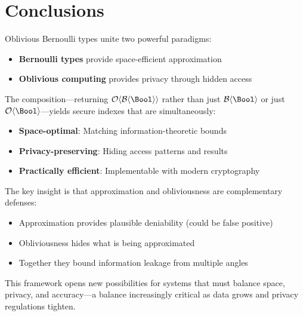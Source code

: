\documentclass[11pt,final,hidelinks]{article}
\newcommand{\BernBool}{\mathcal{B}\langle \Bool \rangle}
\begin{document}
\section{Conclusions}

Oblivious Bernoulli types unite two powerful paradigms:
\begin{itemize}
    \item \textbf{Bernoulli types} provide space-efficient approximation
    \item \textbf{Oblivious computing} provides privacy through hidden access
\end{itemize}

The composition—returning $\Obv{\BernBool}$ rather than just $\BernBool$ or just $\Obv{\Bool}$—yields secure indexes that are simultaneously:
\begin{itemize}
    \item \textbf{Space-optimal}: Matching information-theoretic bounds
    \item \textbf{Privacy-preserving}: Hiding access patterns and results
    \item \textbf{Practically efficient}: Implementable with modern cryptography
\end{itemize}

The key insight is that approximation and obliviousness are complementary defenses:
\begin{itemize}
    \item Approximation provides plausible deniability (could be false positive)
    \item Obliviousness hides what is being approximated
    \item Together they bound information leakage from multiple angles
\end{itemize}

This framework opens new possibilities for systems that must balance space, privacy, and accuracy—a balance increasingly critical as data grows and privacy regulations tighten.


\end{document}
